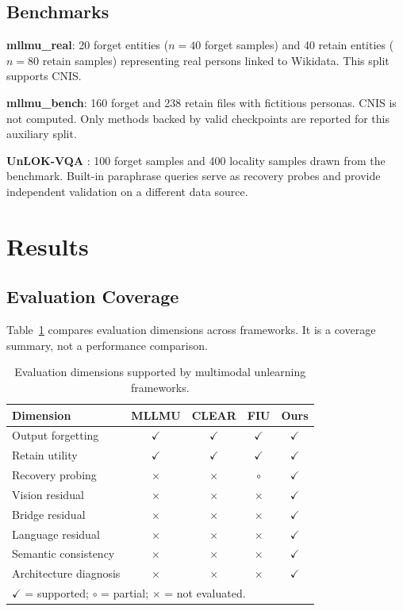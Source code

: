 \documentclass[letterpaper]{article}
\begin{document}
\subsection{Benchmarks}
\textbf{mllmu\_real}: 20 forget entities ($n=40$ forget samples) and 40
retain entities ($n=80$ retain samples) representing real persons linked to
Wikidata. This split supports CNIS.

\textbf{mllmu\_bench}: 160 forget and 238 retain files with fictitious
personas. CNIS is not computed. Only methods backed by valid checkpoints are
reported for this auxiliary split.

\textbf{UnLOK-VQA} \citep{patil2025unlok}: 100 forget samples and 400
locality samples drawn from the benchmark. Built-in paraphrase queries serve
as recovery probes and provide independent validation on a different data
source.

\section{Results}

\subsection{Evaluation Coverage}

Table~\ref{tab:coverage} compares evaluation dimensions across frameworks.
It is a coverage summary, not a performance comparison.

\begin{table}[t]
\centering
\caption{Evaluation dimensions supported by multimodal unlearning frameworks.}
\label{tab:coverage}
\setlength{\tabcolsep}{4pt}
\footnotesize
\begin{tabular}{lcccc}
\toprule
\textbf{Dimension}     & \textbf{MLLMU} & \textbf{CLEAR} & \textbf{FIU} & \textbf{Ours} \\
\midrule
Output forgetting      & $\checkmark$ & $\checkmark$ & $\checkmark$ & $\checkmark$ \\
Retain utility         & $\checkmark$ & $\checkmark$ & $\checkmark$ & $\checkmark$ \\
Recovery probing       & $\times$     & $\times$     & $\circ$      & $\checkmark$ \\
Vision residual        & $\times$     & $\times$     & $\times$     & $\checkmark$ \\
Bridge residual        & $\times$     & $\times$     & $\times$     & $\checkmark$ \\
Language residual      & $\times$     & $\times$     & $\times$     & $\checkmark$ \\
Semantic consistency   & $\times$     & $\times$     & $\times$     & $\checkmark$ \\
Architecture diagnosis & $\times$     & $\times$     & $\times$     & $\checkmark$ \\
\bottomrule
\multicolumn{5}{l}{\footnotesize $\checkmark$ = supported; $\circ$ = partial;
$\times$ = not evaluated.}
\end{tabular}
\end{table}
\end{document}
